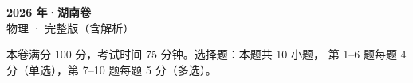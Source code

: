 \documentclass[zihao=-4, a4paper]{ctexart}
\begin{document}
\begin{center}
  {\Large\bfseries 2026 年·湖南卷}\\[4pt]
  {\large 物理 · 完整版（含解析）}
\end{center}
\medskip
\begin{gknotice}
  本卷满分 100 分，考试时间 75 分钟。选择题：本题共 10 小题，
  第 1--6 题每题 4 分（单选），第 7--10 题每题 5 分（多选）。
\end{gknotice}

\clearpage
{}

\clearpage
{}

\end{document}
